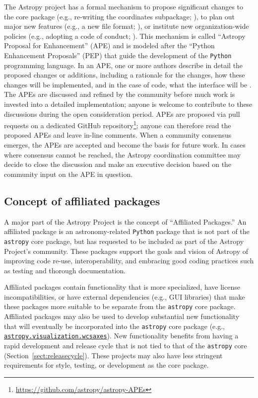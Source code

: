 \documentclass[modern]{aastex62}
\newcommand{\package}[1]{\texttt{#1}\xspace}
\newcommand{\python}{\package{Python}}
\newcommand{\astropy}{Astropy\xspace}
\newcommand{\astropypkg}{\package{astropy}}
\newcommand{\sectionname}{Section\xspace}
\newcommand{\astropywcsaxes}{\href{http://docs.astropy.org/en/stable/visualization/wcsaxes/index.html}{\texttt{astropy.visualization.wcsaxes}}\xspace}
\begin{document}
The \astropy project has a formal mechanism to propose significant changes to
the core package (e.g., re-writing the coordinates subpackage; \citealt{ape5}),
to plan out major new features (e.g., a new file format; \citealt{ape6}), or
institute new organization-wide policies (e.g., adopting a code of conduct;
\citealt{ape8}).
This mechanism is called ``Astropy Proposal for Enhancement'' (APE) and is
modeled after the ``Python Enhancement Proposals'' (PEP) that guide the
development of the \python programming language.
In an APE, one or more authors describe in detail the proposed changes or
additions, including a rationale for the changes, how these changes will be
implemented, and in the case of code, what the interface will be \citep{ape1}.
The APEs are discussed and refined by the community before much work is invested
into a detailed implementation; anyone is welcome to contribute to these
discussions during the open consideration period. APEs are proposed via pull
requests on a dedicated GitHub repository\footnote{\url{https://github.com/astropy/astropy-APEs}};
anyone can therefore read the proposed APEs and leave in-line comments.
When a community consensus emerges, the APEs are accepted and become
the basis for future work.
In cases where consensus cannot be reached, the
\astropy coordination committee may decide to close the discussion and
make an executive decision based on the community input on the APE in question.


\subsection{Concept of affiliated packages}

A major part of the \astropy Project is the concept of ``Affiliated Packages.''
An affiliated package is an astronomy-related
\python package that is not part of the \astropypkg core package, but
has requested to be included as part of the \astropy Project's
community. These packages support the goals and vision of \astropy of
improving code re-use, interoperability, and embracing good coding
practices such as testing and thorough documentation.

Affiliated packages contain functionality that is more specialized,
have license incompatibilities, or have external dependencies (e.g., GUI
libraries) that make these packages more suitable to be separate from the
\astropypkg core package.
Affiliated packages may also be used to develop substantial new functionality
that will eventually be incorporated into the \astropypkg core package
(e.g., \astropywcsaxes).
New functionality benefits from having a rapid development and release cycle 
that is not tied to that of the \astropypkg core (\sectionname~\ref{sect:releasecycle}).  
These projects may also have less stringent requirements for style, testing, or
development as the core package. 
\end{document}
